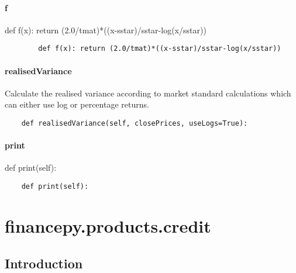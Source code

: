 \documentclass[twoside,11pt]{book}
\begin{document}
\subsubsection*{{\bf f}}
def f(x): return (2.0/tmat)*((x-sstar)/sstar-log(x/sstar)) 

\begin{lstlisting}
        def f(x): return (2.0/tmat)*((x-sstar)/sstar-log(x/sstar))
\end{lstlisting}

\subsubsection*{{\bf realisedVariance}}
Calculate the realised variance according to market standard calculations which can either use log or percentage returns. 

\begin{lstlisting}
    def realisedVariance(self, closePrices, useLogs=True):
\end{lstlisting}

\subsubsection*{{\bf print}}
def print(self): 

\begin{lstlisting}
    def print(self):
\end{lstlisting}


\chapter{financepy.products.credit}
\section{Introduction}
\end{document}
